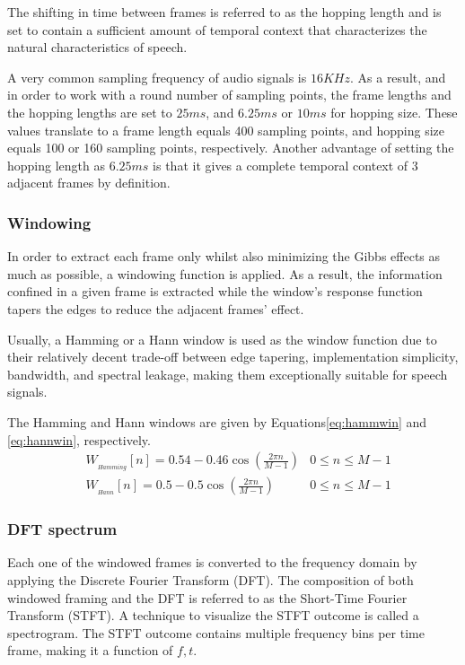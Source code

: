 The shifting in time between frames is referred
to as the hopping length and is set to contain 
a sufficient amount of temporal
context that characterizes the natural
characteristics of speech.

A very common sampling frequency of audio signals
is \(16KHz\). 
As a result, and in order to work with 
a round number of sampling points, 
the frame lengths 
and the hopping lengths 
are set to \(25ms\), and 
\(6.25ms\) or \(10ms\) for hopping size. 
These values translate to a frame length
equals 400 sampling points, and hopping size
equals 100 or 160 sampling points, respectively.
Another advantage of setting the hopping length
as \(6.25ms\) is that it gives
a complete temporal context of 3 adjacent frames
by definition.

\subsubsection{Windowing}
In order to extract each frame only 
whilst also minimizing the Gibbs effects as much as possible,
a windowing function is applied.
As a result, the information confined 
in a given frame is extracted while the 
window's response function tapers 
the edges to reduce the adjacent frames' effect.

Usually, a Hamming or a Hann window 
is used as the window function due to their 
relatively decent trade-off between edge tapering, 
implementation simplicity, bandwidth, and spectral leakage, 
making them exceptionally suitable for speech signals.

The Hamming and Hann windows are given by
Equations\;\ref{eq:hammwin} and \ref{eq:hannwin}, respectively.
\begin{align}
    \label{eq:hammwin} &W_{_{Hamming}}[n] = 0.54 - 0.46
    \cos\left( \frac{2\pi n}{M-1} \right) &
            0 \leq n \leq M - 1 \\
    \label{eq:hannwin} &W_{_{Hann}}[n] = 0.5 - 0.5
            \cos\left( \frac{2\pi n}{M-1} \right) &
            0 \leq n \leq M - 1
\end{align}

\subsubsection{DFT spectrum}
Each one of the windowed frames is
converted to the frequency domain by applying the 
Discrete Fourier Transform (DFT).
The composition of both windowed framing 
and the DFT is referred to as the 
Short-Time Fourier Transform (STFT).
A technique to visualize the STFT outcome is 
called a spectrogram. The STFT outcome contains 
multiple frequency bins per time frame,
making it a function of \(f, t\).

